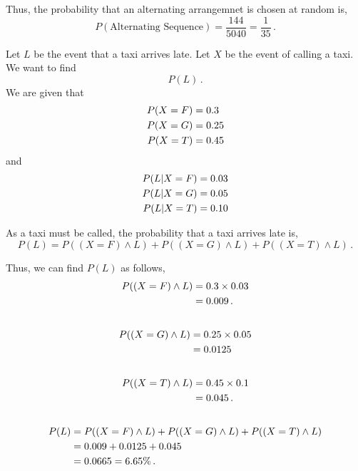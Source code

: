 \begin{subquestions}
\begin{subsubquestions}
Thus, the probability that an alternating arrangemnet is chosen at random is,
\begin{equation}
	P(\text{Alternating Sequence}) = \frac{144}{5040} = \frac{1}{35} \,.
\end{equation}

\end{subsubquestions}	
	

\subquestion

\begin{subsubquestions}
	
\subsubquestion

Let $L$ be the event that a taxi arrives late. Let $X$ be the event of calling a taxi. We want to find
\begin{equation}
	P(L)\,.
\end{equation}
We are given that
\begin{align}
	P(X=F) &= 0.3 \nonumber\\ 
	P(X=G) &= 0.25 \nonumber\\
	P(X=T) &= 0.45 
\end{align}
and
\begin{align}
	P(L|X=F) &= 0.03 \nonumber\\
	P(L|X=G) &= 0.05\nonumber\\
	P(L|X=T) &= 0.10
\end{align}

As a taxi must be called, the probability that a taxi arrives late is,
\begin{equation}
	P(L) = P({(X=F) \land L}) + P((X=G) \land L) + P({(X=T) \land L}) \,.
\end{equation}
	
Thus, we can find $P({L})$ as follows,
\begin{align}
	P({(X=F) \land L}) & = 0.3 \times 0.03 \nonumber \\
	                       & = 0.009 \,. \\ \nonumber 
\end{align}
\begin{align}
	P({(X=G) \land L}) & = 0.25 \times 0.05 \nonumber \\
	 					   & = 0.0125 \, \\ \nonumber 
\end{align}
\begin{align}
	P({(X=T) \land L}) & = 0.45 \times 0.1 \nonumber \\
	 					   & = 0.045 \,.  \\ \nonumber    
\end{align}
\begin{align}	 					   
	P(L) & = P({(X=F) \land L}) + P({(X=G) \land L}) + P({(X=T) \land L}) \nonumber \\
	                    & = 0.009+0.0125+0.045 \nonumber \\
	                    & = 0.0665 = 6.65\% \,.					              
\end{align}


\end{subsubquestions}
\end{subquestions}
